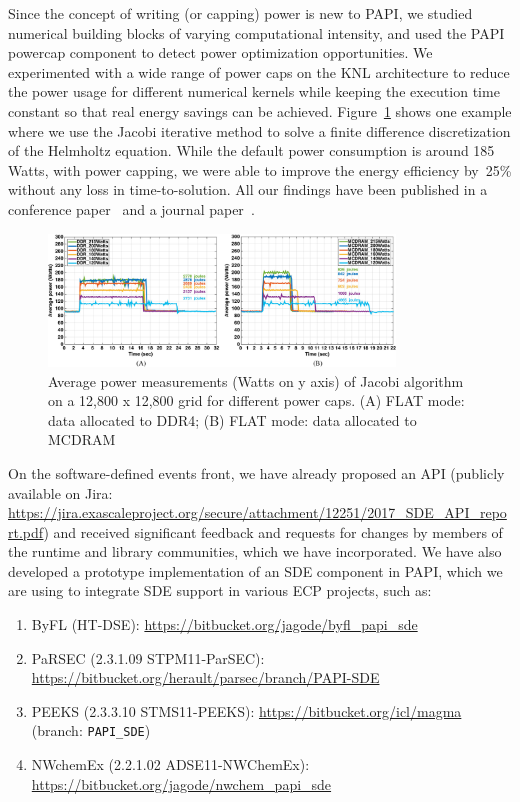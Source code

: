 Since the concept of writing (or capping) power is new to PAPI, we studied
numerical building blocks of varying computational intensity, and used the PAPI
powercap component to detect power optimization opportunities. We experimented
with a wide range of power caps on the KNL architecture to reduce
the power usage for different numerical kernels while keeping the execution
time constant so that real energy savings can be achieved.
Figure~\ref{fig:Jacobi_power} shows one example where we use
the Jacobi iterative method to solve a finite difference discretization of the
Helmholtz equation. While the default power consumption is around 185 Watts,
with power capping, we were able to improve the energy efficiency by~25\%
without any loss in time-to-solution. All our findings have been published in a
conference paper~\cite{power1} and a journal paper~\cite{power2}.
%
\vspace{-4pt}
\begin{figure}[!h]
\begin{center}
\includegraphics[width=0.82\textwidth]{projects/2.3.2-Tools/2.3.2.06-EXA-PAPI/Exa-PAPI-jacobi.pdf}
\caption{Average power measurements (Watts on y axis) of Jacobi algorithm on a 
12,800 x 12,800 grid for different power caps. (A) FLAT mode: data allocated to DDR4; 
(B) FLAT mode: data allocated to MCDRAM}
\label{fig:Jacobi_power}
\end{center}
\end{figure}
%
\vspace{-8pt}

On the software-defined events front, we have already proposed an API
(publicly available on Jira:
\url{https://jira.exascaleproject.org/secure/attachment/12251/2017_SDE_API_report.pdf})
and received significant feedback and requests for changes by members of the
runtime and library communities, which we have incorporated. We have also
developed a prototype implementation of an SDE component in PAPI, which we are
using to integrate SDE support in various ECP projects, such as:
%
\begin{enumerate}
\vspace{-3pt}
\item ByFL (HT-DSE): \url{https://bitbucket.org/jagode/byfl_papi_sde}
\vspace{-5pt}
\item PaRSEC (2.3.1.09 STPM11-ParSEC): \url{https://bitbucket.org/herault/parsec/branch/PAPI-SDE}
\vspace{-5pt}
\item PEEKS (2.3.3.10 STMS11-PEEKS): \url{https://bitbucket.org/icl/magma} (branch: \verb+PAPI_SDE+)
\vspace{-5pt}
\item NWchemEx (2.2.1.02 ADSE11-NWChemEx): \url{https://bitbucket.org/jagode/nwchem_papi_sde}
\end{enumerate}

